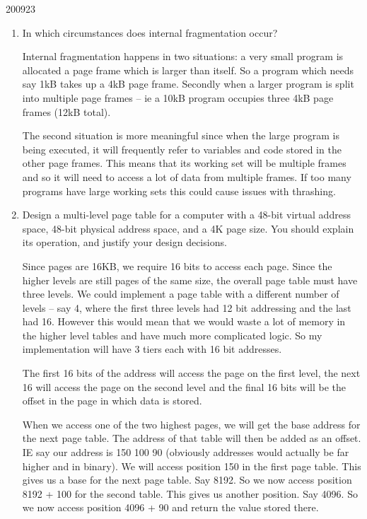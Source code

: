 \documentclass[10pt,\jkfside,a4paper]{article}
\begin{document}
\begin{examquestion}{2009}{2}{3}
\begin{enumerate}
\begin{enumerate}
\item In which circumstances does internal fragmentation occur?

Internal fragmentation happens in two situations: a very small program is allocated a 
page frame which is larger than itself. So a program which needs say 1kB takes up a 
4kB page frame. Secondly when a larger program is split into multiple page frames -- ie 
a 10kB program occupies three 4kB page frames (12kB total).

The second situation is more meaningful since when the large program is being executed, 
it will frequently refer to variables and code stored in the other page frames. This means 
that its working set will be multiple frames and so it will need to access a lot of data from 
multiple frames. If too many programs have large working sets this could cause issues with 
thrashing.

\item Design a multi-level page table for a computer with a 48-bit virtual
address space, 48-bit physical address space, and a 4K page size. You
should explain its operation, and justify your design decisions.

Since pages are 16KB, we require 16 bits to access each page. Since the higher 
levels are still pages of the same size, the overall page table 
must have three levels. We could implement a page table with a 
different number of levels -- say 4, where the first three levels had 
12 bit addressing and the last had 16. However this would mean that 
we would waste a lot of memory in the higher level tables and have 
much more complicated logic. So my implementation will have 3 tiers 
each with 16 bit addresses.

The first 16 bits of the address will access the page on the 
first level, the next 16 will access the page on the second level 
and the final 16 bits will be the offset in the page in which data is 
stored.

When we access one of the two highest pages, we will get the base address 
for the next page table. The address of that table will then be added as an 
offset. IE say our address is 150 100 90 (obviously addresses would actually 
be far higher and in binary). We will access position 
150 in the first page table. This gives us a base for the next page table. Say 
8192. So we now access position 8192 + 100 for the second table. This gives us 
another position. Say 4096. So we now access position 4096 + 90 and return the 
value stored there.


\end{enumerate}
\end{enumerate}
\end{examquestion}
\end{document}
